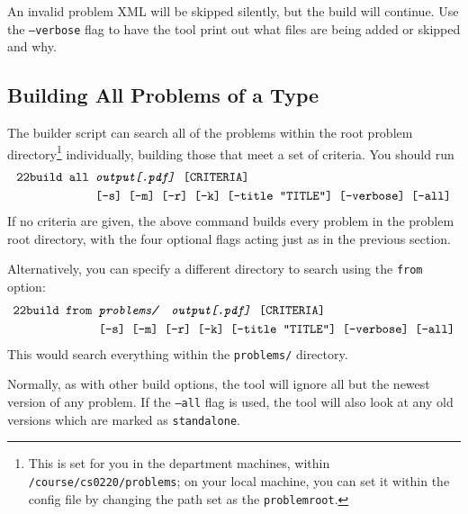     An invalid problem XML will be skipped silently, but the build will
    continue. Use the \texttt{--verbose} flag to have the tool print out 
    what files are being added or skipped and why.
  \subsection{Building All Problems of a Type}
    The builder script can search all of the problems within the root problem 
    directory\footnote{This is set for you in the department machines, within 
    \texttt{/course/cs0220/problems}; on your local machine, you can set it
    within the config file by changing the path set as the 
    \texttt{problemroot}.} 
    individually, building those that meet a set of criteria. You should run
    \begin{align*}
      \texttt{22build }\texttt{all }&\texttt{\textit{output[.pdf]} [CRITERIA]}\\
      ~&\texttt{[-s] [-m] [-r] [-k] [--title ``TITLE''] [--verbose] [--all]}
    \end{align*}
    If no criteria are given, the above command builds every problem in 
    the problem root directory, with the four optional flags acting just 
    as in the previous section.
    
    Alternatively, you can specify a different directory to search using 
    the \texttt{from} option:
    \begin{align*}
      \pybuild\texttt{from }&\texttt{\textit{problems/\ \ output[.pdf]} [CRITERIA]}\\
      ~&\texttt{[-s] [-m] [-r] [-k] [--title ``TITLE''] [--verbose] [--all]}
    \end{align*}
    This would search everything within the \texttt{problems/} directory.
    
    Normally, as with other build options, the tool will ignore all but
    the newest version of any problem. If the \texttt{--all} flag is used,
    the tool will also look at any old versions which are marked as
    \texttt{standalone}.
    
